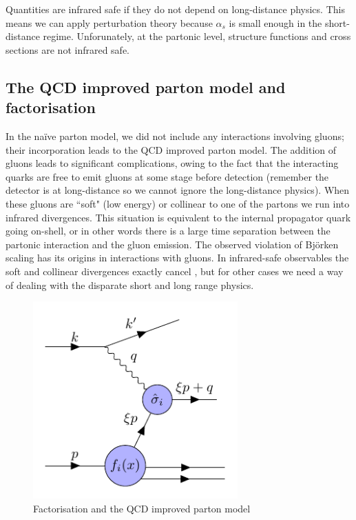 
Quantities are infrared safe if they do not depend on long-distance physics. This means we can apply perturbation theory because $\alpha_s$ is small enough in the short-distance regime. Unforunately, at the partonic level, structure functions and cross sections are not infrared safe. 

\subsection{The QCD improved parton model and factorisation}

In the na\"ive parton model, we did not include any interactions involving gluons; their incorporation leads to the QCD improved parton model. The addition of gluons leads to significant complications, owing to the fact that the interacting quarks are free to emit gluons at some stage before detection (remember the detector is at long-distance so we cannot ignore the long-distance physics). When these gluons are ``soft" (low energy) or collinear to one of the partons we run into infrared divergences. This situation is equivalent to the internal propagator quark going on-shell, or in other words there is a large time separation between the partonic interaction and the gluon emission. The observed violation of Bj\"orken scaling has its origins in interactions with gluons. In infrared-safe observables the soft and collinear divergences exactly cancel \cite{Kinoshita:1962ur, Lee:1964is}, but for other cases we need a way of dealing with the disparate short and long range physics.
 
\begin{figure}[H]
\centering
\includegraphics[width=0.7\textwidth]{../diagrams/improvedparton_dis.pdf}
\caption{\label{fig:improvedparton} Factorisation and the QCD improved parton model}
\end{figure}

